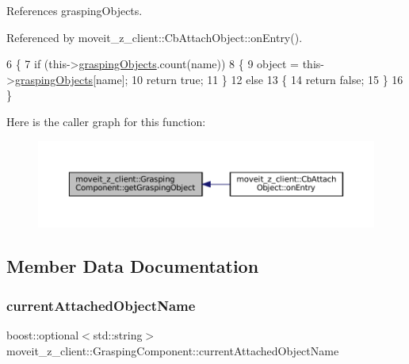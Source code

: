 References grasping\+Objects.



Referenced by moveit\+\_\+z\+\_\+client\+::\+Cb\+Attach\+Object\+::on\+Entry().


\begin{DoxyCode}
6    \{
7       \textcolor{keywordflow}{if} (this->\hyperlink{classmoveit__z__client_1_1GraspingComponent_aca353c6a2eae807176c60bb9dfeea567}{graspingObjects}.count(name))
8       \{
9          \textcolor{keywordtype}{object} = this->\hyperlink{classmoveit__z__client_1_1GraspingComponent_aca353c6a2eae807176c60bb9dfeea567}{graspingObjects}[name];
10          \textcolor{keywordflow}{return} \textcolor{keyword}{true};
11       \}
12       \textcolor{keywordflow}{else}
13       \{
14          \textcolor{keywordflow}{return} \textcolor{keyword}{false};
15       \}
16    \}
\end{DoxyCode}
Here is the caller graph for this function\+:
\nopagebreak
\begin{figure}[H]
\begin{center}
\leavevmode
\includegraphics[width=350pt]{classmoveit__z__client_1_1GraspingComponent_a791e7cd29d7dcbb85012ea1c5827db22_icgraph}
\end{center}
\end{figure}


\subsection{Member Data Documentation}
\mbox{\label{classmoveit__z__client_1_1GraspingComponent_a963ed612bc569ee45401e38133b802eb}} 
\subsubsection{\texorpdfstring{current\+Attached\+Object\+Name}{currentAttachedObjectName}}
{\footnotesize\ttfamily boost\+::optional$<$std\+::string$>$ moveit\+\_\+z\+\_\+client\+::\+Grasping\+Component\+::current\+Attached\+Object\+Name}



